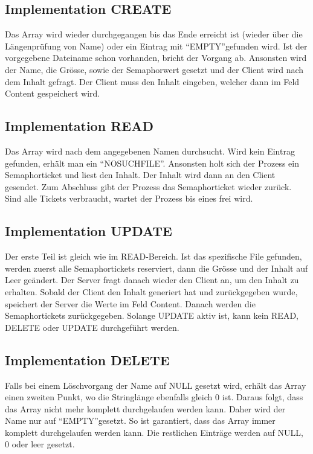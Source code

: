 \documentclass[12pt,a4paper,ngerman]{report}
\begin{document}
\subsection{Implementation CREATE}
Das Array wird wieder durchgegangen bis das Ende erreicht ist (wieder über die Längenprüfung von Name) oder ein Eintrag mit \textquotedblleft EMPTY\textquotedblright gefunden wird. Ist der vorgegebene Dateiname schon vorhanden, bricht der Vorgang ab. Ansonsten wird der Name, die Grösse, sowie der Semaphorwert gesetzt und der Client wird nach dem Inhalt gefragt. Der Client muss den Inhalt eingeben, welcher dann im Feld Content gespeichert wird.
\subsection{Implementation READ}
Das Array wird nach dem angegebenen Namen durchsucht. Wird kein Eintrag gefunden, erhält man ein \textquotedblleft NOSUCHFILE\textquotedblright . Ansonsten holt sich der Prozess ein Semaphorticket und liest den Inhalt. Der Inhalt wird dann an den Client gesendet. Zum Abschluss gibt der Prozess das Semaphorticket wieder zurück. Sind alle Tickets verbraucht, wartet der Prozess bis eines frei wird.
\subsection{Implementation UPDATE}
Der erste Teil ist gleich wie im READ-Bereich. Ist das spezifische File gefunden, werden zuerst alle Semaphortickets reserviert, dann die Grösse und der Inhalt auf Leer geändert. Der Server fragt danach wieder den Client an, um den Inhalt zu erhalten. Sobald der Client den Inhalt generiert hat und zurückgegeben wurde, speichert der Server die Werte im Feld Content. Danach werden die Semaphortickets zurückgegeben. Solange UPDATE aktiv ist, kann kein READ, DELETE oder UPDATE durchgeführt werden.
\subsection{Implementation DELETE}
Falls bei einem Löschvorgang der Name auf NULL gesetzt wird, erhält das Array einen zweiten Punkt, wo die Stringlänge ebenfalls gleich 0 ist. Daraus folgt, dass das Array nicht mehr komplett durchgelaufen werden kann. Daher wird der Name nur auf \textquotedblleft EMPTY\textquotedblright gesetzt. So ist garantiert, dass das Array immer komplett durchgelaufen werden kann. Die restlichen Einträge werden auf NULL, 0 oder leer gesetzt.
\end{document}
